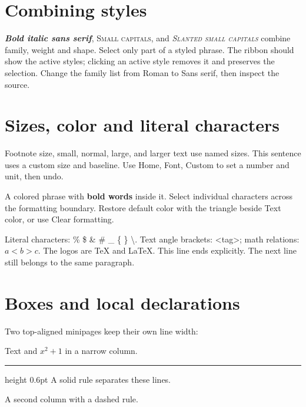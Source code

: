 \documentclass{article}
\begin{document}
\section{Combining styles}
\textsf{\textit{\textbf{Bold italic sans serif}}},
\textrm{\textsc{Small capitals}}, and
\textsl{\textsc{Slanted small capitals}} combine family, weight and shape.
Select only part of a styled phrase. The ribbon should show the active styles;
clicking an active style removes it and preserves the selection. Change the
family list from Roman to Sans serif, then inspect the source.

\section{Sizes, color and literal characters}
{\footnotesize Footnote size}, {\small small}, {\normalsize normal},
{\large large}, and {\LARGE larger text} use named sizes.
{\fontsize{13pt}{16pt}\selectfont This sentence uses a custom size and baseline.}
Use Home, Font, Custom to set a number and unit, then undo.

\textcolor[HTML]{A33D30}{A colored phrase with \textbf{bold words} inside it.}
Select individual characters across the formatting boundary. Restore default
color with the triangle beside Text color, or use Clear formatting.

Literal characters: \% \$ \& \# \_ \{ \} \textbackslash{}.
Text angle brackets: \textless{}tag\textgreater{}; math relations: $a<b>c$.
The logos are \TeX{} and \LaTeX{}. This line ends explicitly.\newline
The next line still belongs to the same paragraph.

\section{Boxes and local declarations}
Two top-aligned minipages keep their own line width:

\noindent\begin{minipage}[t]{0.46\linewidth}
Text and $x^2+1$ in a narrow column.
\par\hrule height 0.6pt
A solid rule separates these lines.
\end{minipage}\hspace{0.04\linewidth}%
\begin{minipage}[t]{0.46\linewidth}
A second column with a dashed rule.
\par\noindent\hdashrule{\linewidth}{0.6pt}{3pt 2pt}
\end{minipage}
\end{document}
